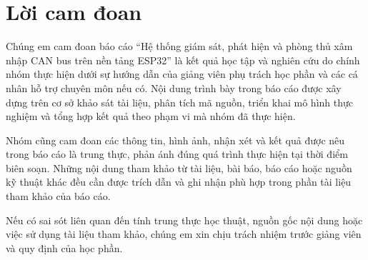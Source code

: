 \chapter*{Lời cam đoan}

Chúng em cam đoan báo cáo ``Hệ thống giám sát, phát hiện và phòng thủ xâm nhập CAN bus trên nền tảng ESP32'' là kết quả học tập và nghiên cứu do chính nhóm thực hiện dưới sự hướng dẫn của giảng viên phụ trách học phần và các cá nhân hỗ trợ chuyên môn nếu có. Nội dung trình bày trong báo cáo được xây dựng trên cơ sở khảo sát tài liệu, phân tích mã nguồn, triển khai mô hình thực nghiệm và tổng hợp kết quả theo phạm vi mà nhóm đã thực hiện.

Nhóm cũng cam đoan các thông tin, hình ảnh, nhận xét và kết quả được nêu trong báo cáo là trung thực, phản ánh đúng quá trình thực hiện tại thời điểm biên soạn. Những nội dung tham khảo từ tài liệu, bài báo, báo cáo hoặc nguồn kỹ thuật khác đều cần được trích dẫn và ghi nhận phù hợp trong phần tài liệu tham khảo của báo cáo.

Nếu có sai sót liên quan đến tính trung thực học thuật, nguồn gốc nội dung hoặc việc sử dụng tài liệu tham khảo, chúng em xin chịu trách nhiệm trước giảng viên và quy định của học phần.

